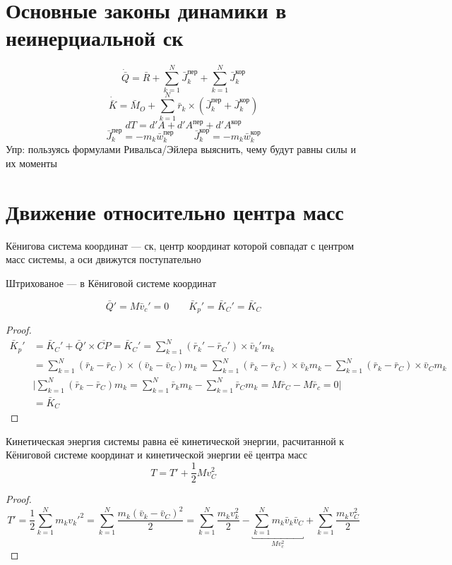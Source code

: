 \documentclass[crop=false]{standalone}
\begin{document}
\section{Основные законы динамики в неинерциальной ск}
\[\dot {\bar Q}  = \bar R + \sum_{k=1}^{N} \bar J_k^\text{пер} + \sum_{k=1}^{N} \bar J_k^\text{кор}\]
\[\dot{\bar K} = \bar M_O + \sum_{k=1}^{N} \bar r_k \times ( \bar J_k^\text{пер} + \bar J_k^\text{кор})\]
\[d T = d ' A + d ' A ^\text{пер} + d ' A^\text{кор}\]
\[\bar J_k^\text{пер} = - m_k \bar w_k^\text{пер} \qquad \bar J_k^\text{кор} = - m_k \bar w_k^\text{кор}\]
Упр: пользуясь формулами Ривальса/Эйлера выяснить, чему будут равны силы и их моменты
\section{Движение относительно центра масс}

\Def Кёнигова система координат — ск, центр координат которой совпадат с центром масс системы, а оси движутся поступательно

Штрихованое — в Кёниговой системе координат

\noindent \keypoint \[
\bar Q' = M \bar v_c ' = 0 \qquad \bar K_p' = \bar K_C' = \bar K_C\]
\begin{proof}
    \[\begin{aligned}
        \bar K_p ' &= \bar K_C ' + \bar Q' \times \overline{CP} = \bar K_C ' = \sum_{k=1}^{N} (\bar r_k ' - \bar r_C ') \times \bar v_k ' m_k \\
        &= \sum_{k=1}^{N} (\bar r_k - \bar r_C) \times (\bar v_k - \bar v_C) m_k = \sum_{k=1}^{N} (\bar r_k - \bar r_C) \times \bar v_k m_k - \sum_{k=1}^{N} (\bar r_k - \bar r_C) \times \bar v_C m_k \\ %
        & \Bigg| \sum_{k=1}^{N} (\bar r_k - \bar r_C) m_k = \sum_{k=1}^{N} \bar r_k m_k - \sum_{k=1}^{N} \bar r_C m_k = M \bar r_C - M \bar r_c = 0 \Bigg|  \\
        &= \bar K_C
    \end{aligned}
    \]
\end{proof}
\begin{theorem}[Кёнига]
    Кинетическая энергия системы равна её кинетической энергии, расчитанной к Кёниговой системе координат и кинетической энергии её центра масс
    \[\boxed{T = T ' + \frac{1}{2} M v_C^2}\]
\end{theorem}
\begin{proof}
\[T ' = \frac{1}{2} \sum_{k=1}^{N} m_k {v_k '}^2 = \sum_{k=1}^{N} \frac{m_k (\bar v_k - \bar v_C)^2}{2} = \sum_{k=1}^{N} \frac{m_k v_k^2}{2} - \underbracket{\sum_{k=1}^{N} m_k \bar v_k \bar v_C}_{M v_c^2} + \sum_{k=1}^{N} \frac{m_k v_C^2}{2}\]
\end{proof}
\end{document}
